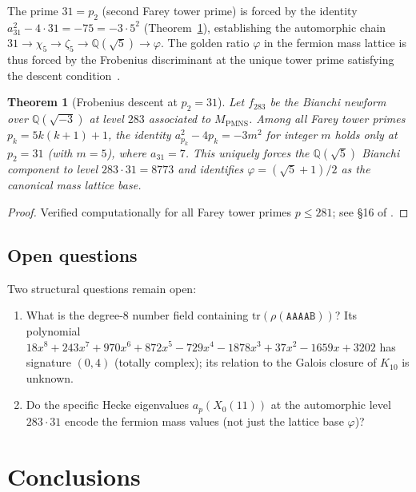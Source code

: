 \documentclass[11pt,a4paper]{article}
\newtheorem{theorem}{Theorem}
\theoremstyle{remark}
\newcommand{\MPMNS}{M_{\mathrm{PMNS}}}
\newcommand{\QQ}{\mathbb{Q}}
\newcommand{\Kten}{K_{10}}
\begin{document}
The prime $31 = p_2$ (second Farey tower prime) is forced by the
identity $a_{31}^2 - 4 \cdot 31 = -75 = -3 \cdot 5^2$
(Theorem~\ref{thm:p31}), establishing the automorphic chain
$31 \to \chi_5 \to \zeta_5 \to \QQ(\sqrt{5}) \to \varphi$.
The golden ratio $\varphi$ in the fermion mass lattice is thus
forced by the Frobenius discriminant at the unique tower prime
satisfying the descent condition~\cite{Gentry:arith}.

\begin{theorem}[Frobenius descent at $p_2 = 31$]
\label{thm:p31}
Let $f_{283}$ be the Bianchi newform over $\QQ(\sqrt{-3})$ at
level $283$ associated to $\MPMNS$.
Among all Farey tower primes $p_k = 5k(k+1)+1$,
the identity $a_{p_k}^2 - 4p_k = -3m^2$ for integer $m$ holds
\emph{only} at $p_2 = 31$ (with $m = 5$), where $a_{31} = 7$.
This uniquely forces the $\QQ(\sqrt{5})$ Bianchi component to level
$283 \cdot 31 = 8773$ and identifies $\varphi = (\sqrt{5}+1)/2$
as the canonical mass lattice base.
\end{theorem}

\begin{proof}\sloppy
Verified computationally for all Farey tower primes $p \leq 281$;
see \S16 of \cite{Gentry:arith}.
\fussy\end{proof}

\subsection{Open questions}

Two structural questions remain open:
\begin{enumerate}
\item What is the degree-8 number field containing
  $\mathrm{tr}(\rho(\mathtt{AAAAB}))$?
  Its polynomial
  $18x^8 + 243x^7 + 970x^6 + 872x^5 - 729x^4 - 1878x^3 + 37x^2
  - 1659x + 3202$
  has signature $(0,4)$ (totally complex); its relation to the
  Galois closure of $\Kten$ is unknown.
\item Do the specific Hecke eigenvalues $a_p(X_0(11))$ at the
  automorphic level $283 \cdot 31$ encode the fermion mass values
  (not just the lattice base $\varphi$)?
\end{enumerate}

\section{Conclusions}
\label{sec:concl}
\end{document}
